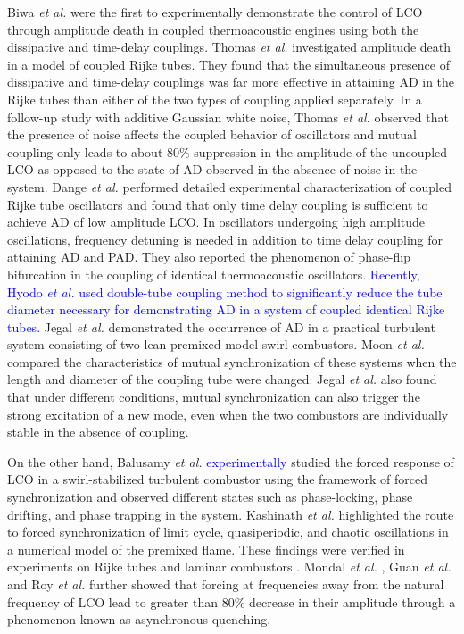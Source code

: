 \documentclass[%
preprint,
 amsmath,amssymb,
 aps,
 pra,
]{revtex4-2}
\begin{document}
Biwa \textit{et al.} \cite{biwa2015amplitude} were the first to experimentally demonstrate the control of LCO through amplitude death in coupled thermoacoustic engines using both the dissipative and time-delay couplings. Thomas \textit{et al.} \cite{thomas2018effect} investigated amplitude death in a model of coupled Rijke tubes. They found that the simultaneous presence of dissipative and time-delay couplings was far more effective in attaining AD in the Rijke tubes than either of the two types of coupling applied separately. In a follow-up study with additive Gaussian white noise, Thomas \textit{et al.} \cite{thomas2018noiseeffect} observed that the presence of noise affects the coupled behavior of oscillators and mutual coupling only leads to about 80\% suppression in the amplitude of the uncoupled LCO as opposed to the state of AD observed in the absence of noise in the system. Dange \textit{et al.} \cite{dange2019oscillation} performed detailed experimental characterization of coupled Rijke tube oscillators and found that only time delay coupling is sufficient to achieve AD of low amplitude LCO. In oscillators undergoing high amplitude oscillations, frequency detuning is needed in addition to time delay coupling for attaining AD and PAD. They also reported the phenomenon of phase-flip bifurcation in the coupling of identical thermoacoustic oscillators. \textcolor{blue}{Recently, Hyodo \textit{et al.} \cite{hyodo2020suppression} used double-tube coupling method to significantly reduce the tube diameter necessary for demonstrating AD in a system of coupled identical Rijke tubes.} Jegal \textit{et al.} \cite{jegal2019mutual} demonstrated the occurrence of AD in a practical turbulent system consisting of two lean-premixed model swirl combustors. Moon \textit{et al.} \cite{moon2020mutual} compared the characteristics of mutual synchronization of these systems when the length and diameter of the coupling tube were changed. Jegal \textit{et al.} \cite{jegal2019mutual} also found that under different conditions, mutual synchronization can also trigger the strong excitation of a new mode, even when the two combustors are individually stable in the absence of coupling.

On the other hand, Balusamy \textit{et al.} \cite{balusamy2015nonlinear} \textcolor{blue}{experimentally} studied the forced response of LCO in a swirl-stabilized turbulent combustor using the framework of forced synchronization and observed different states such as phase-locking, phase drifting, and phase trapping in the system. Kashinath \textit{et al.} \cite{kashinath2018forced} highlighted the route to forced synchronization of limit cycle, quasiperiodic, and chaotic oscillations in a numerical model of the premixed flame. These findings were verified in experiments on Rijke tubes \cite{mondal2019forced} and laminar combustors \cite{guan2019open, roy2020mechanism, guan2019forced}.  Mondal \textit{et al.} \cite{mondal2019forced}, Guan \textit{et al.} \cite{guan2019open} and Roy \textit{et al.} \cite{roy2020mechanism} further showed that forcing at frequencies  away from the natural frequency of LCO lead to greater than 80\% decrease in their amplitude through a phenomenon known as asynchronous quenching. 
\end{document}
